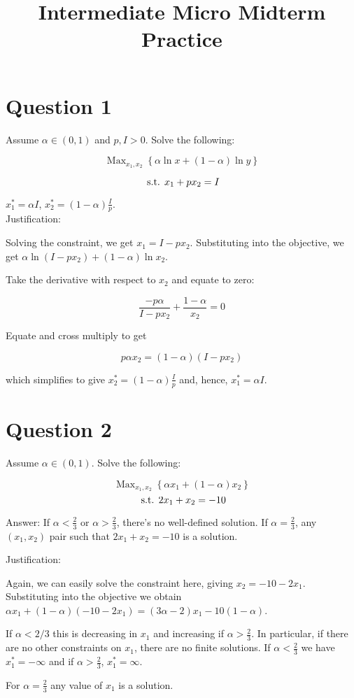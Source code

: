 \documentclass{article}
\newenvironment{solution}{\color{red}}{\color{black}}
\DeclareMathOperator*{\Max}{Max}
\newcommand{\st}{\hbox{ s.t. }}
\begin{document}
\title{Intermediate Micro Midterm Practice}

\maketitle

\section*{Question 1}
Assume $\alpha \in (0,1)$ and $p, I >0$. Solve the following:

\[ \Max_{x_1, x_2} \left\{ \alpha \ln x + \left(1-\alpha \right) \ln y \right\}  \]

\[ \st x_1 + p x_2 = I \]

\begin{solution}
$x_1^* = \alpha I$, $x_2^* = (1-\alpha)\frac{I}{p}$.\\

Justification:

Solving the constraint, we get $x_1 = I-px_2$. Substituting into the objective, we get $\alpha \ln ( I - p x_2 ) + (1-\alpha) \ln x_2 $.

Take the derivative with respect to $x_2$ and equate to zero:

\[ \frac{-p \alpha}{I -p x_2 } + \frac{1-\alpha}{x_2}=0 \]

Equate and cross multiply to get

\[ p \alpha x_2 = (1-\alpha)(I - p x_2) \]

which simplifies to give $x_2^* = (1-\alpha)\frac{I}{p}$ and, hence, $x_1^* = \alpha I$. 
\end{solution}

\section*{Question 2}
Assume $\alpha \in (0,1)$. Solve the following:

\[ \Max_{x_1, x_2} \left\{\alpha x_1 + (1-\alpha) x_2 \right\} \]
\[ \st  2x_1 + x_2 = -10 \]

\begin{solution}
Answer: If $\alpha < \frac23$ or $\alpha > \frac23$, there's no well-defined solution. If $\alpha = \frac23$, any $(x_1, x_2)$ pair such that $2x_1+x_2=-10$ is a solution.

Justification:

Again, we can easily solve the constraint here, giving $x_2 = -10 -2x_1$. Substituting into the objective we obtain $\alpha x_1 + (1-\alpha)(-10 -2x_1) = (3 \alpha-2)x_1 -10(1-\alpha)$.

If $ \alpha < 2/3$ this is decreasing in $x_1$ and increasing if $\alpha > \frac23$. In particular, if there are no other constraints on $x_1$, there are no finite solutions. If $\alpha < \frac23$ we have $x_1^* = -\infty$ and if $\alpha > \frac23$, $x_1^* = \infty$.

For $\alpha = \frac23$ any value of $x_1$ is a solution. 
\end{solution}
\end{document}
